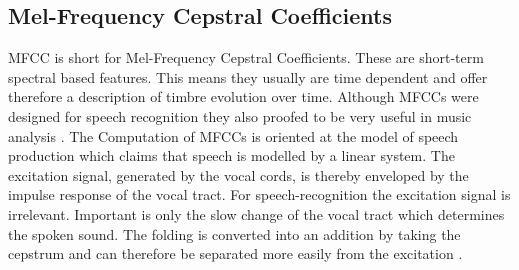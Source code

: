 \documentclass[cic,tc,english]{iiufrgs}
\begin{document}
\subsection{Mel-Frequency Cepstral Coefficients}
MFCC is short for Mel-Frequency Cepstral Coefficients. These are short-term spectral based features. This means they usually are time dependent and offer therefore a description of timbre evolution over time. Although MFCCs were designed for speech recognition they also proofed to be very useful in music analysis \cite{logan2000mel}. The Computation of MFCCs is oriented at the model of speech production which claims that speech is modelled by a linear system. The excitation signal, generated by the vocal cords, is thereby enveloped by the impulse response of the vocal tract. For speech-recognition the excitation signal is irrelevant. Important is only the slow change of the vocal tract which determines the spoken sound. The folding is converted into an addition by taking the cepstrum and can therefore be separated more easily from the excitation \cite{niemann2013klassifikation}.
\end{document}
